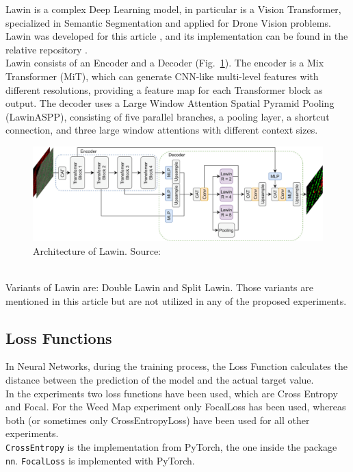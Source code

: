 Lawin is a complex Deep Learning model, in particular is a Vision Transformer, specialized in Semantic Segmentation and applied for Drone Vision problems.
Lawin was developed for this article \cite{WeedMap-PaperThesis}, and its implementation can be found in the relative repository \cite{WeedMap-Repository}.
% 
\\[0.3cm]Lawin consists of an Encoder and a Decoder (Fig.~\ref{fig:figure-3.4.2}).
The encoder is a Mix Transformer (MiT), which can generate CNN-like multi-level features with different resolutions, providing a feature map for each Transformer block as output.
The decoder uses a Large Window Attention Spatial Pyramid Pooling (LawinASPP), consisting of five parallel branches, a pooling layer, a shortcut connection, and three large window attentions with different context sizes.
\begin{figure}[t]
	\centering
	\includegraphics[width=15cm]{figures/figure-3.4.2.png}
	\caption[Architecture of Lawin]{Architecture of Lawin. Source: \cite{WeedMap-PaperThesis}}
	\label{fig:figure-3.4.2}
\end{figure}
% 
\\[0.3cm]Variants of Lawin are: Double Lawin and Split Lawin.
Those variants are mentioned in this article \cite{WeedMap-PaperThesis} but are not utilized in any of the proposed experiments.

\subsection{Loss Functions}

In Neural Networks, during the training process, the Loss Function calculates the distance between the prediction of the model and the actual target value.
\\[0.3cm]In the experiments two loss functions have been used, which are Cross Entropy and Focal.
For the Weed Map experiment only FocalLoss has been used, whereas both (or sometimes only CrossEntropyLoss) have been used for all other experiments.
\\[0.3cm]\texttt{CrossEntropy} is the implementation from PyTorch, the one inside the package \texttt{nn}. \texttt{FocalLoss} is implemented with PyTorch.

